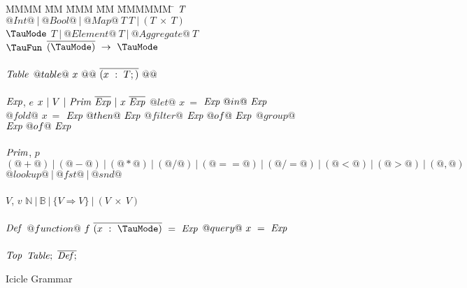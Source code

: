 
\begin{figure}
  \begin{center}
  \begin{minipage}{0.4\textwidth}
\begin{tabbing}
MMMM \= MM \= MMM \= MM \= MMMMMM \= \kill
$\mathit{T}$
\GrammarDefTab
  $@Int@~|~@Bool@~|~@Map@~T~T~|~(T~\times~T)$
\\
$\mi{\TauMode}$
\GrammarDefTab
  $T~|~@Element@~T~|~@Aggregate@~T$
\\
$\mi{\TauFun}$
\GrammarDefTab
  $\ov{(\TauMode)}~\to~\TauMode$
\\
\\

$\mathit{Table}$
\GrammarDefTab
  $@table@~x~@{@~\overline{(x~:~T;)}~@}@$
\\
\\

$\mathit{Exp}$, $e$
\GrammarDefTab
  $x~|~V~|~\mathit{Prim}~\overline{\mathit{Exp}}~|~x~\overline{\mathit{Exp}}$
\GrammarAlt
  $@let@$   \> $x~=$ \> $\mathit{Exp}~@  in@~\mathit{Exp}$
\GrammarAlt
  $@fold@$  \> $x~=$ \> $\mathit{Exp}~@then@~\mathit{Exp}$
\GrammarAlt
  $@filter@$\> \> $\mathit{Exp}~@  of@~\mathit{Exp}$
\GrammarAlt
  $@group@$ \> \> $\mathit{Exp}~@  of@~\mathit{Exp}$
\\
\\

$\mathit{Prim}$, $p$
\GrammarDefTab
  $(@+@)~|~(@-@)~|~(@*@)~|~(@/@)~|~(@==@)~|~(@/=@)~|~(@<@)~|~(@>@)~|~(@,@)$
\GrammarAlt
  $@lookup@~|~@fst@~|~@snd@$
\\
\\

$V$, $v$
\GrammarDefTab
 $\mathbb{N}~|~\mathbb{B}~|~\{V \Rightarrow V\}~|~(V~\times~V)$
\\
\\


$\mathit{Def}$
\GrammarDefTab
  $@function@~f~\ov{(x~:~\TauMode)}~=~\mi{Exp}$
\GrammarAlt
  $@query@~x~=~\mathit{Exp}$
\\
\\
$\mathit{Top}$
\GrammarDefTab
  $\mathit{Table};~\overline{\mathit{Def};}$
\end{tabbing}
\end{minipage}
  \end{center}

\caption{Icicle Grammar}
\label{icicle:fig:source:grammar}
\end{figure}

